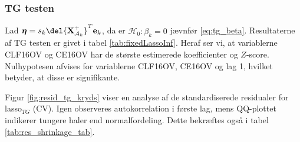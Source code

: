 \subsubsection{TG testen}
Lad $\boldsymbol{\eta} = s_k \del{\textbf{X}^+_{\mathcal{A}_k}}^T \mathbf{e}_k$, da er $\mathcal{H}_0: \beta_k = 0$ jævnfør \eqref{eq:tg_beta}. 
Resultaterne af TG testen er givet i tabel \ref{tab:fixedLassoInf}.
Heraf ser vi, at variablerne \textcolor{blue3}{CLF16OV} og \textcolor{blue3}{CE16OV} har de største estimerede koefficienter og $Z$-score.
Nulhypotesen afvises for variablerne \textcolor{blue3}{CLF16OV}, \textcolor{blue3}{CE16OV} og \textcolor{blue3}{lag 1}, hvilket betyder, at disse er signifikante.

Figur \ref{fig:resid_tg_kryds} viser en analyse af de standardiserede residualer for lasso$_{TG}$ (CV). 
Igen observeres autokorrelation i første lag, mens QQ-plottet indikerer tungere haler end normalfordeling. 
Dette bekræftes også i tabel \ref{tab:res_shrinkage_tab}.


%
